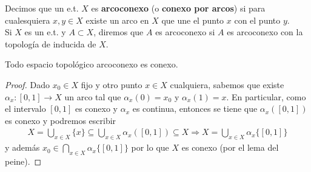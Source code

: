 \begin{definicion}
    Decimos que un e.t. $X$ es \textbf{arcoconexo} (o \textbf{conexo por arcos}) si para cualesquiera $x,y\in X$ existe un arco en $X$ que une el punto $x$ con el punto $y$.\\

    Si $X$ es un e.t. y $A\subset X$, diremos que $A$ es arcoconexo si $A$ es arcoconexo con la topología de inducida de $X$.
\end{definicion}

\begin{teo}
    Todo espacio topológico arcoconexo es conexo.
    \begin{proof}
        Dado $x_0\in X$ fijo y otro punto $x\in X$ cualquiera, sabemos que existe $\alpha_x:[0,1]\to X$ un arco tal que $\alpha_x(0)=x_0$ y $\alpha_x(1)=x$. En particular, como el intervalo $[0,1]$ es conexo y $\alpha_x$ es continua, entonces se tiene que $\alpha_x([0,1])$ es conexo y podremos escribir 
        \begin{gather*}
            X=\bigcup\limits_{x\in X}\{x\}\subseteq \bigcup\limits_{x\in X} \alpha_x ([0,1])\subseteq X \Rightarrow X = \bigcup\limits_{x\in X}\alpha_x\{[0,1]\}
        \end{gather*}
        y además $x_0 \in \bigcap\limits_{x\in X}\alpha_x\{[0,1]\}$ por lo que $X$ es conexo (por el lema del peine).
    \end{proof}
\end{teo}

